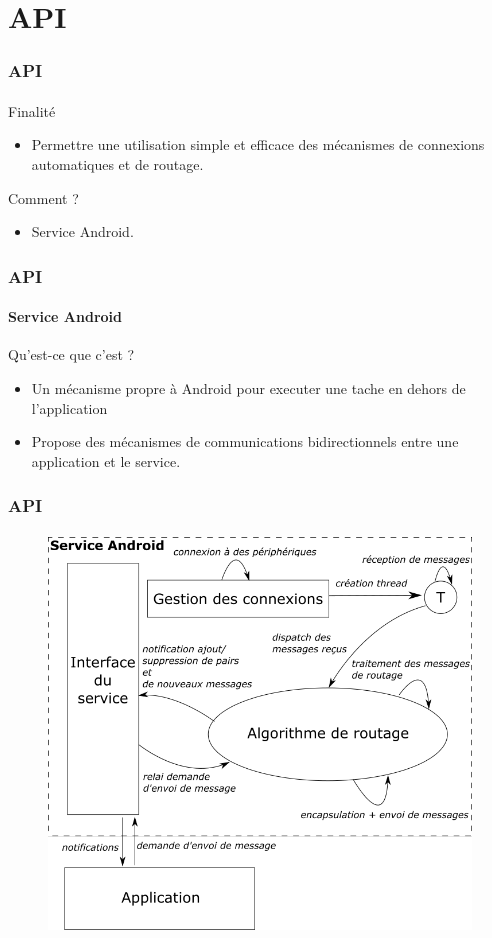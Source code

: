 \documentclass{beamer}
\begin{document}
  \section{API}
  \begin{frame}
    \frametitle{API}
    \framesubtitle{}
  	\begin{block}{Finalité}
        \begin{itemize}
        	\item Permettre une utilisation simple et efficace des mécanismes de connexions automatiques et de routage.
        \end{itemize}
    \end{block}
    \begin{block}{Comment ?}
    \begin{itemize}
    	\item Service Android.
    \end{itemize}
    \end{block}
  \end{frame}
    \begin{frame}
    \frametitle{API}
    \framesubtitle{Service Android}
  	\begin{block}{Qu'est-ce que c'est ?}
        \begin{itemize}
        	\item Un mécanisme propre à Android pour executer une tache en dehors de l'application
        	\item Propose des mécanismes de communications bidirectionnels entre une application et le service.
        \end{itemize}
    \end{block}
  \end{frame}
  \begin{frame}
    \frametitle{API}
    \framesubtitle{}
        \begin{figure}
          \begin{center}
            \includegraphics[width=.6\textwidth]{images/api.png}
            \label{fig:auto}
          \end{center}
        \end{figure}
  \end{frame}
  
\end{document}
